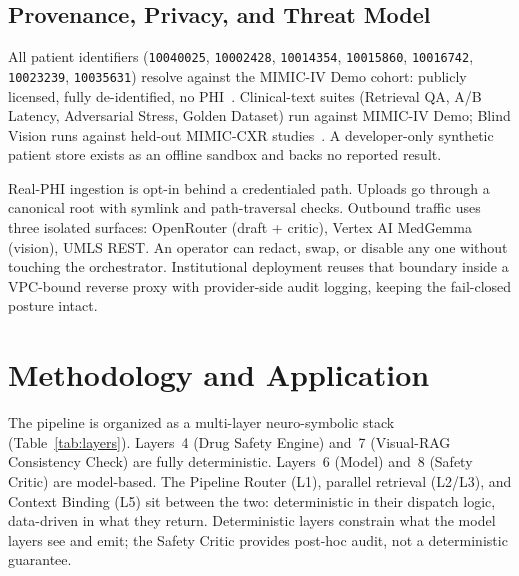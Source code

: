 \documentclass[twocolumn,10pt,main=USenglish]{asmeconf}
\begin{document}
\subsection{Provenance, Privacy, and Threat Model}
\label{sec:provenance}
All patient identifiers (\texttt{10040025}, \texttt{10002428},
\texttt{10014354}, \texttt{10015860}, \texttt{10016742},
\texttt{10023239}, \texttt{10035631}) resolve against the MIMIC-IV
Demo cohort: publicly licensed, fully de-identified, no
PHI~\cite{johnson2023mimiciv}. Clinical-text suites (Retrieval QA,
A/B Latency, Adversarial Stress, Golden Dataset) run against
MIMIC-IV Demo; Blind Vision runs against held-out MIMIC-CXR
studies~\cite{johnson2019mimiccxr}. A developer-only synthetic
patient store exists as an offline sandbox and backs no reported
result.

Real-PHI ingestion is opt-in behind a credentialed path. Uploads
go through a canonical root with symlink and path-traversal
checks. Outbound traffic uses three isolated surfaces: OpenRouter
(draft + critic), Vertex AI MedGemma (vision), UMLS REST. An
operator can redact, swap, or disable any one without touching the
orchestrator. Institutional deployment reuses that boundary inside
a VPC-bound reverse proxy with provider-side audit logging,
keeping the fail-closed posture intact.

\section{Methodology and Application}
\label{sec:method}

The pipeline is organized as a multi-layer neuro-symbolic stack
(Table~\ref{tab:layers}). Layers~4 (Drug Safety Engine) and~7
(Visual-RAG Consistency Check) are fully deterministic. Layers~6
(Model) and~8 (Safety Critic) are model-based. The Pipeline
Router (L1), parallel retrieval (L2/L3), and Context Binding (L5)
sit between the two: deterministic in their dispatch logic,
data-driven in what they return. Deterministic layers constrain
what the model layers see and emit; the Safety Critic provides
post-hoc audit, not a deterministic guarantee.
\end{document}
